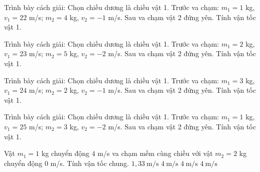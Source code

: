 \begin{bt}
Trình bày cách giải: Chọn chiều dương là chiều vật 1. Trước va chạm: $m_1=1$ kg, $v_1=22$ m/s; $m_2=4$ kg, $v_2=-1$ m/s. Sau va chạm vật 2 đứng yên. Tính vận tốc vật 1.
\end{bt}

\begin{bt}
Trình bày cách giải: Chọn chiều dương là chiều vật 1. Trước va chạm: $m_1=2$ kg, $v_1=23$ m/s; $m_2=5$ kg, $v_2=-2$ m/s. Sau va chạm vật 2 đứng yên. Tính vận tốc vật 1.
\end{bt}

\begin{bt}
Trình bày cách giải: Chọn chiều dương là chiều vật 1. Trước va chạm: $m_1=3$ kg, $v_1=24$ m/s; $m_2=2$ kg, $v_2=-1$ m/s. Sau va chạm vật 2 đứng yên. Tính vận tốc vật 1.
\end{bt}

\begin{bt}
Trình bày cách giải: Chọn chiều dương là chiều vật 1. Trước va chạm: $m_1=1$ kg, $v_1=25$ m/s; $m_2=3$ kg, $v_2=-2$ m/s. Sau va chạm vật 2 đứng yên. Tính vận tốc vật 1.
\end{bt}

\begin{ex}
Vật $m_1=1$ kg chuyển động $4$ m/s va chạm mềm cùng chiều với vật $m_2=2$ kg chuyển động $0$ m/s. Tính vận tốc chung.
\choice
{\True $1,33\ \mathrm{m/s}$}
{$4\ \mathrm{m/s}$}
{$4\ \mathrm{m/s}$}
{$4\ \mathrm{m/s}$}
\end{ex}

